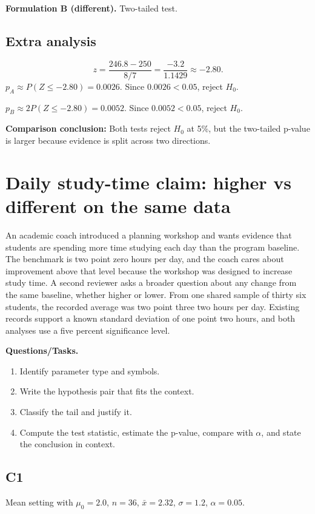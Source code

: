 \textbf{Formulation B (different).} Two-tailed test. \TwoTailGraph

\subsection*{Extra analysis}
\[
z=\frac{246.8-250}{8/7}=\frac{-3.2}{1.1429}\approx -2.80.
\]
\(p_A\approx P(Z\le -2.80)=0.0026\).
Since \(0.0026<0.05\), reject \(H_0\).

\(p_B\approx 2P(Z\le -2.80)=0.0052\).
Since \(0.0052<0.05\), reject \(H_0\).

\textbf{Comparison conclusion:} Both tests reject \(H_0\) at 5\%, but the two-tailed p-value is larger because evidence is split across two directions.


\section{Daily study-time claim: higher vs different on the same data}
An academic coach introduced a planning workshop and wants evidence that students are spending more time studying each day than the program baseline. The benchmark is two point zero hours per day, and the coach cares about improvement above that level because the workshop was designed to increase study time. A second reviewer asks a broader question about any change from the same baseline, whether higher or lower. From one shared sample of thirty six students, the recorded average was two point three two hours per day. Existing records support a known standard deviation of one point two hours, and both analyses use a five percent significance level.

\textbf{Questions/Tasks.}
\begin{enumerate}
    \item[(C1)] Identify parameter type and symbols.
    \item[(C2)] Write the hypothesis pair that fits the context.
    \item[(C3)] Classify the tail and justify it.
    \item[(Extra analysis)] Compute the test statistic, estimate the p-value, compare with \(\alpha\), and state the conclusion in context.
\end{enumerate}

\subsection*{C1}
Mean setting with \(\mu_0=2.0\), \(n=36\), \(\bar{x}=2.32\), \(\sigma=1.2\), \(\alpha=0.05\).

